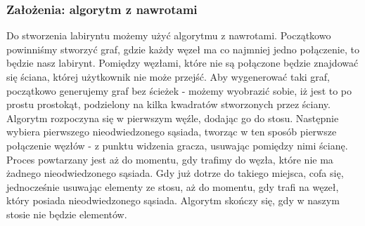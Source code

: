 \documentclass[oneside,polski,logo]{amuthesis}
\begin{document}
\subsubsection{Założenia: algorytm z nawrotami}
Do stworzenia labiryntu możemy użyć algorytmu z nawrotami. Początkowo powinniśmy stworzyć graf, gdzie każdy węzeł ma co najmniej jedno połączenie, to będzie nasz labirynt. Pomiędzy węzłami, które nie są połączone będzie znajdować się ściana, której użytkownik nie może przejść. Aby wygenerować taki graf, początkowo  generujemy graf bez ścieżek - możemy wyobrazić sobie, iż jest to po prostu prostokąt, podzielony na kilka kwadratów stworzonych przez ściany. Algorytm rozpoczyna się w pierwszym węźle, dodając go do stosu. Następnie wybiera pierwszego nieodwiedzonego sąsiada, tworząc w ten sposób pierwsze połączenie węzłów - z punktu widzenia gracza, usuwając pomiędzy nimi ścianę. Proces powtarzany jest aż do momentu, gdy trafimy do węzła, które nie ma żadnego nieodwiedzonego sąsiada. Gdy już dotrze do takiego miejsca, cofa się, jednocześnie usuwając elementy ze stosu, aż do momentu, gdy trafi na węzeł, który posiada nieodwiedzonego sąsiada. Algorytm skończy się, gdy w naszym stosie nie będzie elementów. \cite{maze}
\end{document}
